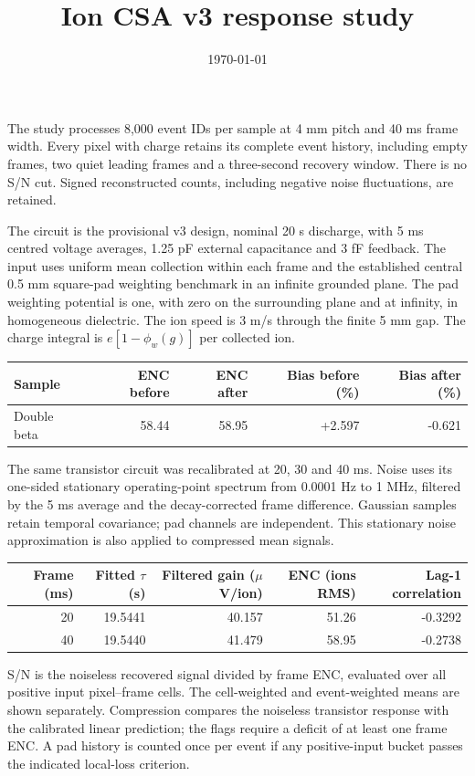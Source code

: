 \documentclass[10pt,a4paper]{article}
\title{Ion CSA v3 response study}
\date{\today}
\begin{document}
\maketitle
The study processes 8,000 event IDs per sample at 4 mm pitch
and 40 ms frame width. Every pixel with charge retains its
complete event history, including empty frames, two quiet leading frames and a
three-second recovery window. There is no S/N cut. Signed reconstructed counts,
including negative noise fluctuations, are retained.

The circuit is the provisional v3 design, nominal 20 s discharge, with 5 ms
centred voltage averages, 1.25 pF external capacitance and 3 fF feedback. The input
uses uniform mean collection within each frame and the established central
0.5 mm square-pad weighting benchmark in an infinite grounded plane. The pad
weighting potential is one, with zero on the surrounding plane and at infinity,
in homogeneous dielectric. The ion speed is 3 m/s through the finite 5 mm gap.
The charge integral is $e[1-\phi_w(g)]$ per collected ion.

\begin{center}\small\begin{tabular}{lrrrr}\toprule Sample & ENC before & ENC after & Bias before (\%) & Bias after (\%)\\\midrule
Double beta & 58.44 & 58.95 & +2.597 & -0.621 \\\bottomrule\end{tabular}\end{center}

The same transistor circuit was recalibrated at 20, 30 and 40 ms. Noise uses its
one-sided stationary operating-point spectrum from 0.0001 Hz to 1 MHz, filtered
by the 5 ms average and the decay-corrected frame difference. Gaussian samples
retain temporal covariance; pad channels are independent. This stationary noise
approximation is also applied to compressed mean signals.
\begin{center}\begin{tabular}{rrrrr}\toprule
Frame (ms) & Fitted $\tau$ (s) & Filtered gain ($\mu$V/ion) & ENC (ions RMS) & Lag-1 correlation\\\midrule
20 & 19.5441 & 40.157 & 51.26 & -0.3292 \\
40 & 19.5440 & 41.479 & 58.95 & -0.2738 \\
\bottomrule\end{tabular}\end{center}

S/N is the noiseless recovered signal divided by frame ENC, evaluated over all
positive input pixel--frame cells. The cell-weighted and event-weighted means
are shown separately. Compression compares the noiseless transistor response
with the calibrated linear prediction; the flags require a deficit of at least
one frame ENC. A pad history is counted once per event if any positive-input
bucket passes the indicated local-loss criterion.
\end{document}
